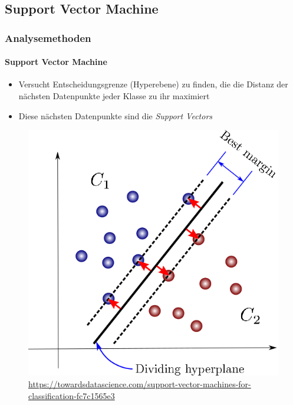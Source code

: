 \subsection{Support Vector Machine}
\begin{frame}
\frametitle{Analysemethoden}
\framesubtitle{Support Vector Machine}
\begin{itemize}\setlength\parskip{12pt}
\item Versucht Entscheidungsgrenze (Hyperebene) zu finden, die die Distanz der nächsten Datenpunkte jeder Klasse zu ihr maximiert
\item Diese nächsten Datenpunkte sind die \textit{Support Vectors}
\end{itemize}
\begin{figure}
	\centering
	\includegraphics[scale=0.25]{svm.png}\\
	\quelle\url{https://towardsdatascience.com/support-vector-machines-for-classification-fc7c1565e3}
\end{figure}
\end{frame}
